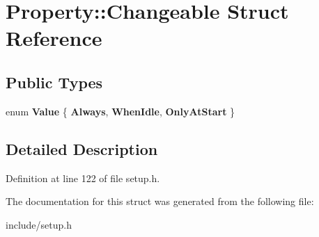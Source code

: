 \hypertarget{structProperty_1_1Changeable}{\section{Property\-:\-:Changeable Struct Reference}
\label{structProperty_1_1Changeable}
}
\subsection*{Public Types}
\begin{DoxyCompactItemize}
\item 
enum {\bfseries Value} \{ {\bfseries Always}, 
{\bfseries When\-Idle}, 
{\bfseries Only\-At\-Start}
 \}
\end{DoxyCompactItemize}


\subsection{Detailed Description}


Definition at line 122 of file setup.\-h.



The documentation for this struct was generated from the following file\-:\begin{DoxyCompactItemize}
\item 
include/setup.\-h\end{DoxyCompactItemize}
